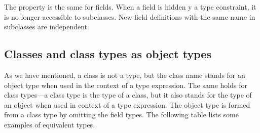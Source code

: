 The property is the same for fields.  When a field is hidden y a type constraint, it is no longer
accessible to subclasses.  New field definitions with the same name in subclasses are independent.
  
\subsection{Classes and class types as object types}

As we have mentioned, a class is not a type, but the class name stands for an object type
when used in the context of a type expression.  The same holds for class types---a class type is the
type of a class, but it also stands for the type of an object when used in context of a type
expression.  The object type is formed from a class type by omitting the field types.
The following table lists some examples of equivalent types.

